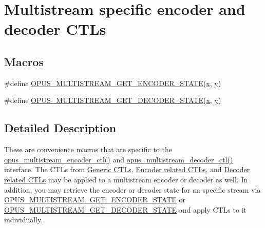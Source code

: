 \hypertarget{group__opus__multistream__ctls}{}\section{Multistream specific encoder and decoder C\+T\+Ls}
\label{group__opus__multistream__ctls}
\subsection*{Macros}
\begin{DoxyCompactItemize}
\item 
\#define \hyperlink{group__opus__multistream__ctls_ga4e67607eb691c4314a5de90d8c58aff0}{O\+P\+U\+S\+\_\+\+M\+U\+L\+T\+I\+S\+T\+R\+E\+A\+M\+\_\+\+G\+E\+T\+\_\+\+E\+N\+C\+O\+D\+E\+R\+\_\+\+S\+T\+A\+TE}(\hyperlink{fmaths_8inl_a7ba8ab2f1e8f362163e17da3f15a5db9}{x},  \hyperlink{fmaths_8inl_ad01ab75ae50a1a624185bfa014c66cfa}{y})
\item 
\#define \hyperlink{group__opus__multistream__ctls_gaf0843831519b4d9b9d73391afef04a53}{O\+P\+U\+S\+\_\+\+M\+U\+L\+T\+I\+S\+T\+R\+E\+A\+M\+\_\+\+G\+E\+T\+\_\+\+D\+E\+C\+O\+D\+E\+R\+\_\+\+S\+T\+A\+TE}(\hyperlink{fmaths_8inl_a7ba8ab2f1e8f362163e17da3f15a5db9}{x},  \hyperlink{fmaths_8inl_ad01ab75ae50a1a624185bfa014c66cfa}{y})
\end{DoxyCompactItemize}


\subsection{Detailed Description}
These are convenience macros that are specific to the \hyperlink{group__opus__multistream_ga0f8756c84c7c62a38f99fb5cd6ed68af}{opus\+\_\+multistream\+\_\+encoder\+\_\+ctl()} and \hyperlink{group__opus__multistream_ga3c6402c3bb276d7a152d9934ce948431}{opus\+\_\+multistream\+\_\+decoder\+\_\+ctl()} interface. The C\+T\+Ls from \hyperlink{group__opus__genericctls}{Generic C\+T\+Ls}, \hyperlink{group__opus__encoderctls}{Encoder related C\+T\+Ls}, and \hyperlink{group__opus__decoderctls}{Decoder related C\+T\+Ls} may be applied to a multistream encoder or decoder as well. In addition, you may retrieve the encoder or decoder state for an specific stream via \hyperlink{group__opus__multistream__ctls_ga4e67607eb691c4314a5de90d8c58aff0}{O\+P\+U\+S\+\_\+\+M\+U\+L\+T\+I\+S\+T\+R\+E\+A\+M\+\_\+\+G\+E\+T\+\_\+\+E\+N\+C\+O\+D\+E\+R\+\_\+\+S\+T\+A\+TE} or \hyperlink{group__opus__multistream__ctls_gaf0843831519b4d9b9d73391afef04a53}{O\+P\+U\+S\+\_\+\+M\+U\+L\+T\+I\+S\+T\+R\+E\+A\+M\+\_\+\+G\+E\+T\+\_\+\+D\+E\+C\+O\+D\+E\+R\+\_\+\+S\+T\+A\+TE} and apply C\+T\+Ls to it individually. 

